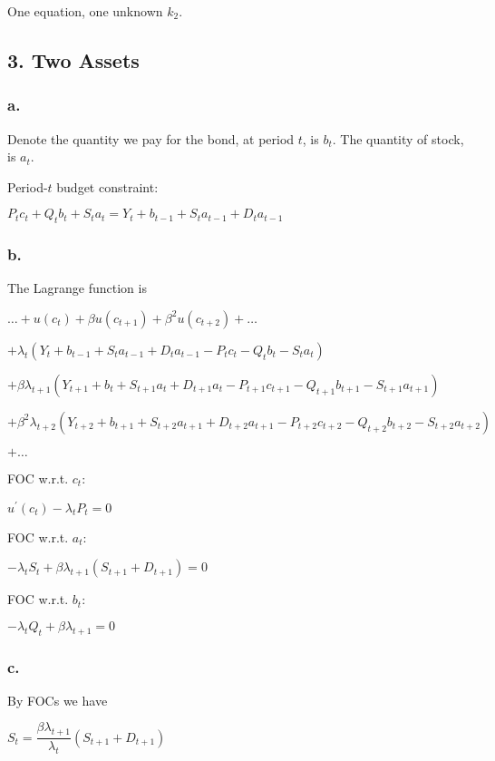 \documentclass{article}
\begin{document}
One equation, one unknown $k_{2}$.

\subsection*{\textrm{3. Two Assets}}

\subsubsection*{\textrm{a.}}

Denote the quantity we pay for the bond, at period $t$, is $b_{t}$. The quantity of stock, is $a_{t}$.

Period-$t$ budget constraint:

$\boxed{P_{t}c_{t}+Q_{t}b_{t}+S_{t}a_{t}=Y_{t}+b_{t-1}+S_{t}a_{t-1}+D_{t}a_{t-1}}$

\subsubsection*{\textrm{b.}}

The Lagrange function is 

$\dots +u\left(c_{t}\right)+\beta u\left(c_{t+1}\right)+\beta^{2} u\left(c_{t+2}\right)+\dots$

$+\lambda_{t}\left(Y_{t}+b_{t-1}+S_{t}a_{t-1}+D_{t}a_{t-1}-P_{t}c_{t}-Q_{t}b_{t}-S_{t}a_{t}\right)$

$+\beta\lambda_{t+1}\left(Y_{t+1}+b_{t}+S_{t+1}a_{t}+D_{t+1}a_{t}-P_{t+1}c_{t+1}-Q_{t+1}b_{t+1}-S_{t+1}a_{t+1}\right)$

$+\beta^{2}\lambda_{t+2}\left(Y_{t+2}+b_{t+1}+S_{t+2}a_{t+1}+D_{t+2}a_{t+1}-P_{t+2}c_{t+2}-Q_{t+2}b_{t+2}-S_{t+2}a_{t+2}\right)$

$+\dots$

FOC w.r.t. $c_{t}$:

$u^{\prime}\left(c_{t}\right)-\lambda_{t}P_{t}=0$

FOC w.r.t. $a_{t}$:

$-\lambda_{t}S_{t}+\beta\lambda_{t+1}\left(S_{t+1}+D_{t+1}\right)=0$

FOC w.r.t. $b_{t}$:

$-\lambda_{t}Q_{t}+\beta\lambda_{t+1}=0$

\subsubsection*{\textrm{c.}}

By FOCs we have

$S_{t}=\dfrac{\beta\lambda_{t+1}}{\lambda_{t}}\left(S_{t+1}+D_{t+1}\right)$
\end{document}
